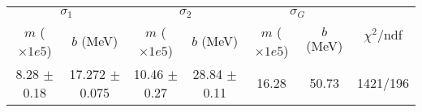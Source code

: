 \begin{tabular}{cc|cc|cc||c}
\multicolumn{2}{c|}{$\sigma_1$} & \multicolumn{2}{|c}{$\sigma_2$} & \multicolumn{2}{|c}{$\sigma_G$}  & \multirow{2}{*}{$\chi^2/$ndf}\\
$m$ ($\times1e5$) & $b$ (MeV) & $m$ ($\times1e5$) & $b$ (MeV) & $m$ ($\times1e5$) & $b$ (MeV) & \\
\hline
8.28 $\pm$ 0.18 & 17.272 $\pm$ 0.075 & 10.46 $\pm$ 0.27 & 28.84 $\pm$ 0.11 & 16.28 & 50.73 & 1421/196\\
\end{tabular}

